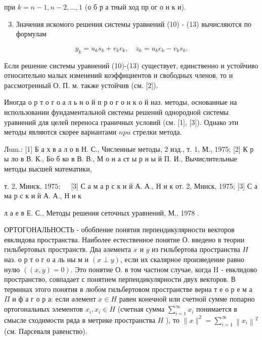 \documentclass[10pt]{article}
\begin{document}
при $k=n-1, n-2, \ldots, 1$ (о б р а тный ход пр ог о н к и).



\begin{enumerate}

  \setcounter{enumi}{2}

  \item Значения искомого решения системы уравнений (10) - (13) вычисляются по формулам

\end{enumerate}



\[

y_{k}=u_{k} s_{k}+v_{k} c_{k}, \quad z_{k}=u_{k} c_{k}-v_{k} s_{k} .

\]



Если решение системы уравнений (10)-(13) существует, единственно и устойчиво относительно малых изменений коэффициентов и свободных членов, то и рассмотренный О. П. м. также устойчив (см. [2]).



Иногда о р т о г о а л ь н о й п р о г о н к о й наз. методы, основанные на использовании фундаментальной системы решений однородной системы уравнений для целей переноса граничных условий (см. [1], [3]). Однако эти методы являются скорее вариантами $n p u$ стрелки метода.



Лum.: [1] Б а х в а л о в Н. С., Численные методы, 2 изд., т. 1, М., 1975; [2] К р ы ло в В. К., Бо б ко в В. В., М о н а ст ы р н ы й П. И., Вычислительные методы высшей математики,

т. 2, Минск, $1975 ; \quad$ [3] С а м а р с к и й А. А., Н и к от. 2, Минск, 1975; [3] С а ма р с к и й А. А., Н и к

л а е в Е. С., Методы решения сеточных уравнений, М., 1978 .



ОРТОГОНАЛЬНОСТЬ - обобпение понятия перпендикулярности векторов евклидова пространства. Наиболее естественное понятие О. введено в теории гильбертовых пространств. Два әлемента $x$ и $y$ из гильбертова пространства $H$ наз. о р т о г о а ль ны м и $(x \perp y)$, если их скалярное произведение равно нулю $((x, y)=0)$. Это понятие О. в том частном случае, когда H - евклидово пространство, совпадает с понятием перпендикулярности двух векторов. В терминах этого понятия в любом гильбертовом пространстве верна т е о р е м а $\Pi$ и ф а г о р а: если әлемент $x \in H$ равен конечной или счетной сумме попарно ортогональных элементов $x_{i}, x_{i} \in H$ (счетная сумма $\sum_{i=1}^{\infty} x_{i}$ понимается в смысле сходимости ряда в метрике пространства $H$ ), то $\|x\|^{2}=\sum_{i=1}^{\infty}\left\|x_{i}\right\|^{2}$ (см. Парсеваля равенство).
\end{document}
